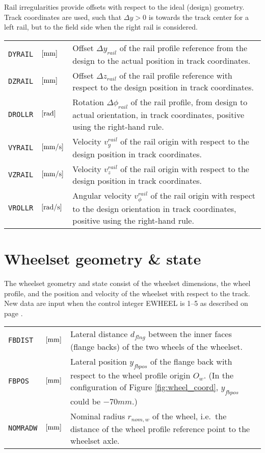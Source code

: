 \documentclass[12pt]{report}
\renewcommand{\magenta}[1]{}
\newenvironment{inputvars}{\vspace{0.4\baselineskip}%

\begin{tabular}{>{\raggedright}p{22mm}p{19mm}p{113mm}}}{
\end{tabular}

}
\newcommand{\inpvar}[3]{{\small\tt #1} & $#2$ & #3 \\[1ex]}
\begin{document}
Rail irregularities provide offsets with respect to the ideal (design)
geometry. Track coordinates are used, such that $\Delta y>0$ is towards
the track center for a left rail, but to the field side when the right rail
is considered.
\begin{inputvars}
\inpvar{DYRAIL}{\bunit{mm}}{Offset $\Delta y_{rail}$ of the rail profile
        reference from the design to the actual position in track coordinates.}
\inpvar{DZRAIL}{\bunit{mm}}{Offset $\Delta z_{rail}$ of the rail profile
        reference with respect to the design position in track coordinates.}
\inpvar{DROLLR}{\bunit{rad}}{Rotation $\Delta \phi_{rail}$ of the rail profile,
        from design to actual orientation, in track coordinates,
        positive using the right-hand rule.}
\inpvar{VYRAIL}{\bunit{mm/s}}{Velocity $v_y^{rail}$ of the rail origin with
        respect to the design position in track coordinates.}
\inpvar{VZRAIL}{\bunit{mm/s}}{Velocity $v_z^{rail}$ of the rail origin with
        respect to the design position in track coordinates.}
\inpvar{VROLLR}{\bunit{rad/s}}{Angular velocity $v_\phi^{rail}$ of the rail
        origin with respect to the design orientation in track coordinates,
        positive using the right-hand rule.}
\end{inputvars}

\magenta{
The massless rail model of Equation (\ref{eq:cntc_defl}) is activated using
control digit ${\tt F}_1=3$, and takes the following inputs:
\begin{inputvars}
\inpvar{KYRAIL}{\bunit{N/mm}}{Effective lateral rail stiffness $k^*_y$.}
\inpvar{FYRAIL}{\bunit{N}}{Lateral spring force $F_y^*$ from ground on rail
        at zero deflection.}
\inpvar{KZRAIL}{\bunit{N/mm}}{Effective vertical rail stiffness $k^*_z$.}
\inpvar{FZRAIL}{\bunit{N}}{Vertical spring force $F_z^*$ from ground on
        rail at zero deflection.}
\end{inputvars}
}
 
\section{Wheelset geometry \& state}
\label{sec:wheelset_geom}

The wheelset geometry and state consist of the wheelset dimensions, the
wheel profile, and the position and velocity of the wheelset with respect
to the track. New data are input when the control integer EWHEEL is 1--5
as described on page \pageref{e1-digit}.
\begin{inputvars}
\inpvar{FBDIST}{\bunit{mm}}{Lateral distance $d_{flng}$ between the inner faces
        (flange backs) of the two wheels of the wheelset.}
\inpvar{FBPOS}{\bunit{mm}}{Lateral position $y_{fbpos}$ of the flange back with
        respect to the wheel profile origin $O_w$. (In the configuration of
        Figure \ref{fig:wheel_coord}, $y_{fbpos}$ could be $-70\unit{mm}$.)}
\inpvar{NOMRADW}{\bunit{mm}}{Nominal radius $r_{nom,w}$ of the wheel, i.e.\ the
        distance of the wheel profile reference point to the wheelset axle.}
\end{inputvars}
\end{document}
